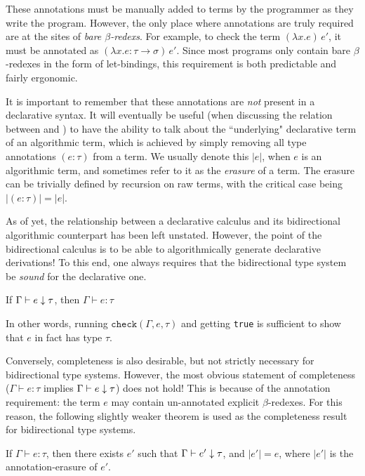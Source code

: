 These annotations must be manually added to terms by the programmer as they write the program. However, the only place where annotations are truly required are at the sites of \textit{bare $\beta$-redexs}. For example, to check the term $(\lambda x. e)\, e'$, it must be annotated as $(\lambda x.e : \tau \to \sigma) \, e'$. Since most programs only contain bare $\beta$-redexes in the form of let-bindings, this requirement is both predictable and fairly ergonomic.

It is important to remember that these annotations are \textit{not} present in a declarative syntax. It will eventually be useful (when discussing the relation between \bilambdaamor and \dlambdaamor) to have the ability to talk about the ``underlying" declarative term of an algorithmic term, which is achieved by simply removing all type annotations $(e : \tau)$ from a term. We usually denote this $|e|$, when $e$ is an algorithmic term, and sometimes refer to it as the \textit{erasure} of a term. The erasure can be trivially defined by recursion on raw terms, with the critical case being $|(e : \tau)| = |e|$.

As of yet, the relationship between a declarative calculus and its bidirectional algorithmic counterpart has been left unstated. However, the point of the bidirectional calculus is to be able to algorithmically generate declarative derivations! To this end, one always requires that the bidirectional type system be \textit{sound} for the declarative one.
\begin{theorem}
If $\Gamma \vdash e \downarrow \tau$, then $\Gamma \vdash e : \tau$
\end{theorem}
In other words, running $\texttt{check}(\Gamma,e,\tau)$ and getting \texttt{true} is sufficient to show that $e$ in fact has type $\tau$.

Conversely, completeness is also desirable, but not strictly necessary for bidirectional type systems. However, the most obvious statement of completeness ($\Gamma \vdash e : \tau$ implies $\Gamma \vdash e \downarrow \tau$) does not hold! This is because of the annotation requirement: the term $e$ may contain un-annotated explicit $\beta$-redexes. For this reason, the following slightly weaker theorem is used as the completeness result for bidirectional type systems.
\begin{theorem}
\label{thm:bidir-compl-example}
If $\Gamma \vdash e : \tau$, then there exists $e'$ such that $\Gamma \vdash e' \downarrow \tau$, and $|e'| = e$, where $|e'|$ is the annotation-erasure of $e'$.
\end{theorem}

